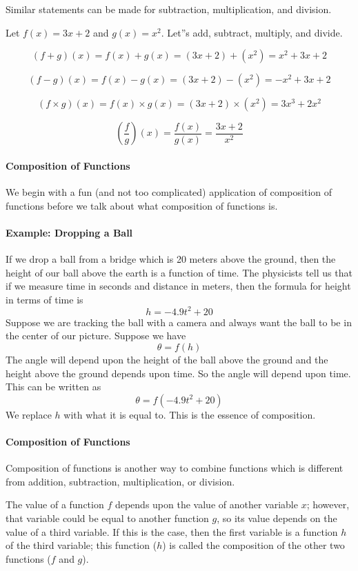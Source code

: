 Similar statements can be made for subtraction, multiplication, and division.

Let $f(x) = 3x + 2$ and $g(x) = x^2$. Let''s add, subtract, multiply, and divide.

$$(f + g)(x) = f(x) + g(x) = (3x + 2) + (x^2) = x^2 + 3x + 2$$

$$(f - g)(x) = f(x) - g(x) = (3x + 2) - (x^2) = -x^2 + 3x + 2$$

$$(f \times g)(x) = f(x) \times g(x) = (3x + 2) \times (x^2) = 3x^3 + 2x^2$$

$$\left(\frac{f}{g}\right)(x) = \frac{f(x)}{g(x)} = \frac{3x + 2}{x^2}$$

\paragraph{Composition of Functions}

We begin with a fun (and not too complicated) application of composition of functions before we talk about what composition of functions is.

\paragraph{Example: Dropping a Ball}

If we drop a ball from a bridge which is 20 meters above the ground, then the height of our ball above the earth is a function of time. The physicists tell us that if we measure time in seconds and distance in meters, then the formula for height in terms of time is 
$$
h = -4.9t^2 + 20
$$
Suppose we are tracking the ball with a camera and always want the ball to be in the center of our picture. Suppose we have 
$$
\theta = f(h)
$$
The angle will depend upon the height of the ball above the ground and the height above the ground depends upon time. So the angle will depend upon time. This can be written as 
$$
\theta = f(-4.9t^2 + 20)
$$
We replace $h$ with what it is equal to. This is the essence of composition.

\paragraph{Composition of Functions}

Composition of functions is another way to combine functions which is different from addition, subtraction, multiplication, or division.

The value of a function $f$ depends upon the value of another variable $x$; however, that variable could be equal to another function $g$, so its value depends on the value of a third variable. If this is the case, then the first variable is a function $h$ of the third variable; this function ($h$) is called the composition of the other two functions ($f$ and $g$).

